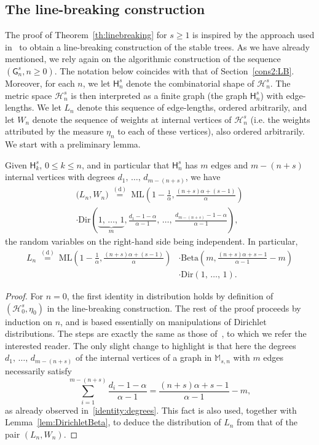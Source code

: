 \documentclass[AHL,Unicode,longabstracts,published]{cedram}
\newcommand{\Betal}{\mathrm{Beta}}
\newcommand{\ML}{\mathrm{ML}}
\newcommand{\Dir}{\mathrm{Dir}}
\newcommand{\cH}{\mathcal{H}}
\newcommand{\sG}{\mathsf{G}}
\newcommand{\sH}{\mathsf{H}}
\newcommand{\M}{\mathbb{M}}
\begin{document}
\subsection{The line-breaking construction}\label{sec:LB}

The proof of Theorem~\ref{th:linebreaking} for $s \geq 1$ is inspired by the approach used in~\cite{GHlinebreaking} to obtain a line-breaking construction of the stable trees. As we have already mentioned, we rely again on the algorithmic construction of the sequence $(\sG_n^s,n\geq 0)$. The notation below coincides with that of Section~\ref{cons2:LB}. Moreover, for each $n$, we let $\sH^s_{n}$ denote the combinatorial shape of $\cH^s_n$. The metric space $\cH^s_{n}$ is then interpreted as a finite graph (the graph $\sH^s_{n}$) with edge-lengths. We let $L_{n}$ denote this sequence of edge-lengths, ordered arbitrarily, and let $W_{n}$ denote the sequence of weights at internal vertices of $\cH^s_{n}$ (i.e. the weights attributed by the measure $\eta_n$ to each of these vertices), also ordered arbitrarily. We start with a preliminary lemma.

\begin{lemm}\label{lem:lengthslinebreaking}
Given $\sH^s_{k}$, $0 \leq k \leq n$, and in particular that $\sH^{s}_n$ has $m$ edges and $m-(n+s)$ internal vertices with degrees $d_1,\,\ldots,\,d_{m-(n+s)}$, we have
\begin{multline*}
\big(L_{n}, W_{n}\big) \ \overset{\mathrm{(d)}}= \ \ML\left(1-\frac{1}{\alpha},\frac{(n+s) \alpha +(s-1)}{\alpha} \right) \\
\cdot \Dir\left(\underbrace{1,\,\ldots,\,1}_m,\frac{d_1-1-\alpha}{\alpha-1},\,\ldots,\,\frac{d_{m-(n+s)}-1-\alpha}{\alpha-1}\right),
\end{multline*}
the random variables on the right-hand side being independent. In particular,
\begin{align*}
L_{n} \ \overset{\mathrm{(d)}}= \ \ML\left(1-\frac{1}{\alpha},\frac{(n+s) \alpha +(s-1)}{\alpha} \right) &\cdot \Betal\left(m, \frac{(n+s)\alpha+s-1}{\alpha-1}-m \right)\\
&\cdot \Dir\left(1,\,\ldots,\,1\right).
\end{align*}
\end{lemm}

\begin{proof}
For $n=0$, the first identity in distribution holds by definition of $(\cH^s_{0},\eta_0)$ in the line-breaking construction. The rest of the proof proceeds by induction on $n$, and is based essentially on manipulations of Dirichlet distributions. The steps are exactly the same as those of~\cite[Proposition~3.2]{GHlinebreaking}, to which we refer the interested reader. The only slight change to highlight is that here the degrees $d_1,\,\ldots,\,d_{m-{(n+s)}}$ of the internal vertices of a graph in $\M_{s,n}$ with $m$ edges necessarily satisfy
\[
\sum_{i=1}^{m-(n+s)}\frac{d_i-1-\alpha}{\alpha-1}=\frac{(n+s)\alpha+s-1}{\alpha-1}-m,
\]
as already observed in~\eqref{identity:degrees}. This fact is also used, together with Lemma~\ref{lem:DirichletBeta}, to deduce the distribution of $L_{n}$ from that of the pair $(L_{n},W_{n})$.
\end{proof}
\end{document}
